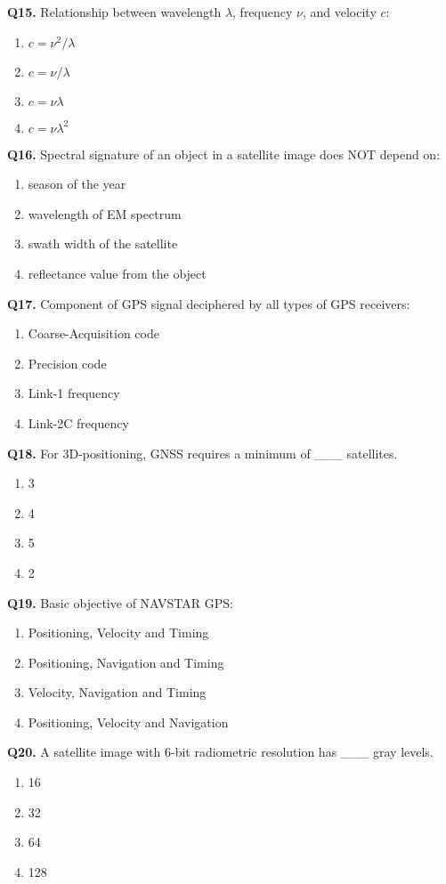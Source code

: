 \documentclass[12pt,a4paper]{article}
\begin{document}
\textbf{Q15.} Relationship between wavelength $\lambda$, frequency $\nu$, and velocity $c$:  
\begin{enumerate}
    \item $c = \nu^2 / \lambda$
    \item $c = \nu / \lambda$
    \item $c = \nu \lambda$
    \item $c = \nu \lambda^2$
\end{enumerate}

\textbf{Q16.} Spectral signature of an object in a satellite image does NOT depend on:  
\begin{enumerate}
    \item season of the year
    \item wavelength of EM spectrum
    \item swath width of the satellite
    \item reflectance value from the object
\end{enumerate}

\textbf{Q17.} Component of GPS signal deciphered by all types of GPS receivers:  
\begin{enumerate}
    \item Coarse-Acquisition code
    \item Precision code
    \item Link-1 frequency
    \item Link-2C frequency
\end{enumerate}

\textbf{Q18.} For 3D-positioning, GNSS requires a minimum of \_\_\_ satellites.  
\begin{enumerate}
    \item 3
    \item 4
    \item 5
    \item 2
\end{enumerate}

\textbf{Q19.} Basic objective of NAVSTAR GPS:  
\begin{enumerate}
    \item Positioning, Velocity and Timing
    \item Positioning, Navigation and Timing
    \item Velocity, Navigation and Timing
    \item Positioning, Velocity and Navigation
\end{enumerate}

\textbf{Q20.} A satellite image with 6-bit radiometric resolution has \_\_\_ gray levels.  
\begin{enumerate}
    \item 16
    \item 32
    \item 64
    \item 128
\end{enumerate}
\end{document}
